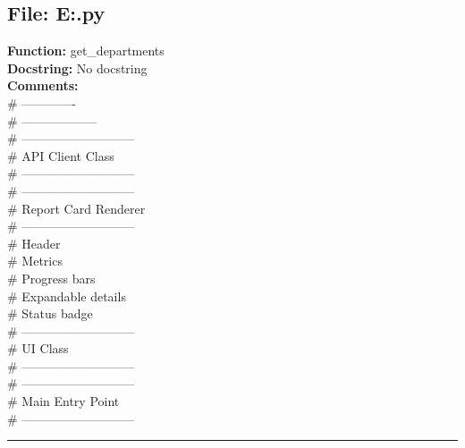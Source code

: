 {\subsection*{File: E:\project\capstone\frontend\view.py}
\textbf{Function:} get_departments\\
\textbf{Docstring:} No docstring\\
\textbf{Comments:}\\
# -------------\\
# ------------------\\
# ---------------------------\\
# API Client Class\\
# ---------------------------\\
# ---------------------------\\
# Report Card Renderer\\
# ---------------------------\\
# Header\\
# Metrics\\
# Progress bars\\
# Expandable details\\
# Status badge\\
# ---------------------------\\
# UI Class\\
# ---------------------------\\
# ---------------------------\\
# Main Entry Point\\
# ---------------------------\\

\hrule

}
